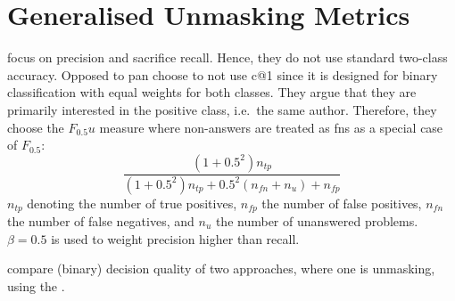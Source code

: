 \section{Generalised Unmasking Metrics}
\label{sec:generalized_unmasking_metrics}

\citet{bevendorff_generalizing_2019} focus on precision and sacrifice recall.
Hence, they do not use standard two-class accuracy.
Opposed to \ac{pan} \citet{bevendorff_generalizing_2019} choose to not use c@1 since it is designed for 
binary classification with equal weights for both classes.
They argue that they are primarily interested in the positive class, i.e.\ the same author.
Therefore, they choose the $F_0.5u$ measure where non-answers are treated as \acp{fn} as a special case of $F_{0.5}$:
$$\frac{(1+0.5^2)n_{tp}}{(1+0.5^2)n_{tp}+0.5^2(n_{fn}+n_{u})+n_{fp}}$$
$n_{tp}$ denoting the number of true positives, $n_{fp}$ the number of false positives, 
$n_{fn}$ the number of false negatives, and $n_{u}$ the number of unanswered problems.
$\beta=0.5$ is used to weight precision higher than recall.


\citet{bevendorff_bias_2019} compare (binary) decision quality of two approaches, where one is unmasking, 
using the .